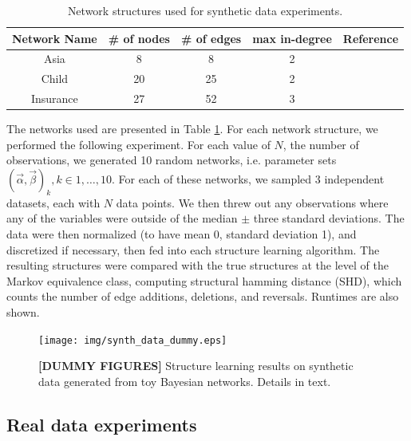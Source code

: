\documentclass{article} %
\begin{document}
\begin{table}[h]
\centering
\begin{tabular}{|c|c|c|c|l|}
\hline
Network Name & \# of nodes & \# of edges & max in-degree & Reference                         \\ \hline
Asia         & 8           & 8           & 2             & \cite{lauritzen1988local}        \\ \hline
Child        & 20          & 25          & 2             & \cite{spiegelhalter1992learning} \\ \hline
Insurance    & 27          & 52          & 3             & \cite{binder1997adaptive}        \\ \hline
\end{tabular}
\caption{Network structures used for synthetic data experiments.}
\label{networks}
\end{table}

The networks used are presented in Table \ref{networks}. For each network structure, we performed the following experiment.  For each value of $N$, the number of observations, we generated 10 random networks, i.e. parameter sets $(\vec{\alpha}, \vec{\beta})_k, k \in 1, \ldots, 10$.  For each of these networks, we sampled 3 independent datasets, each with $N$ data points.  We then threw out any observations where any of the variables were outside of the median $\pm$ three standard deviations.  The data were then normalized (to have mean 0, standard deviation 1), and discretized if necessary, then fed into each structure learning algorithm.  The resulting structures were compared with the true structures at the level of the Markov equivalence class, computing structural hamming distance (SHD), which counts the number of edge additions, deletions, and reversals.  Runtimes are also shown.

\begin{figure}[h]
\centering
\texttt{[image: img/synth\_data\_dummy.eps]} 
\caption{{\bf[DUMMY FIGURES]} Structure learning results on synthetic data generated from toy Bayesian networks.  Details in text.}
\label{fig:synth}
\end{figure}

\subsection{Real data experiments}
\end{document}
